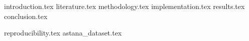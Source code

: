\documentclass[a4paper,12pt,oneside,openbib,oldfontcommands]{memoir}
\theoremstyle{plain}
\theoremstyle{definition}
\theoremstyle{plain}
\begin{document}
\mainmatter
\setcounter{page}{1}

{introduction.tex}
{literature.tex}
{methodology.tex}
{implementation.tex}
{results.tex}
{conclusion.tex}

\appendix
{reproducibility.tex}
{astana_dataset.tex}

\end{document}
